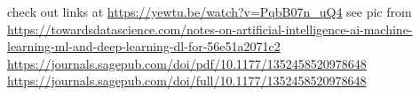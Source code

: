 \cite{cherkassky1998learning}
check out links at \url{https://yewtu.be/watch?v=PqbB07n\_uQ4}
see pic from \url{https://towardsdatascience.com/notes-on-artificial-intelligence-ai-machine-learning-ml-and-deep-learning-dl-for-56e51a2071c2}
\url{https://journals.sagepub.com/doi/pdf/10.1177/1352458520978648}
\url{https://journals.sagepub.com/doi/full/10.1177/1352458520978648}
